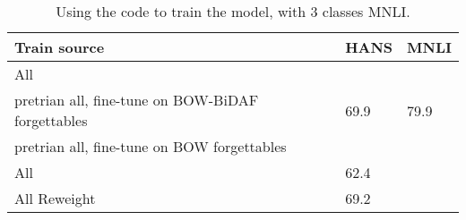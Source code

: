 \begin{table}[h]
    \centering
    \begin{tabular}{l | l l}
        Train source & HANS & MNLI \\
        \hline
        All &  & \\
        \hline
        pretrian all, fine-tune on BOW-BiDAF forgettables & 69.9 & 79.9\\
        pretrian all, fine-tune on BOW forgettables & \\
        \hline 
        All \citep{clark2019dont} & 62.4 & \\
        All Reweight \citep{clark2019dont} & 69.2 \\
        
    \end{tabular}
    \caption{Using the \cite{clark2019dont} code to train the model, with 3 classes MNLI. }
    \label{tab:threeclass}
\end{table}
\fi
